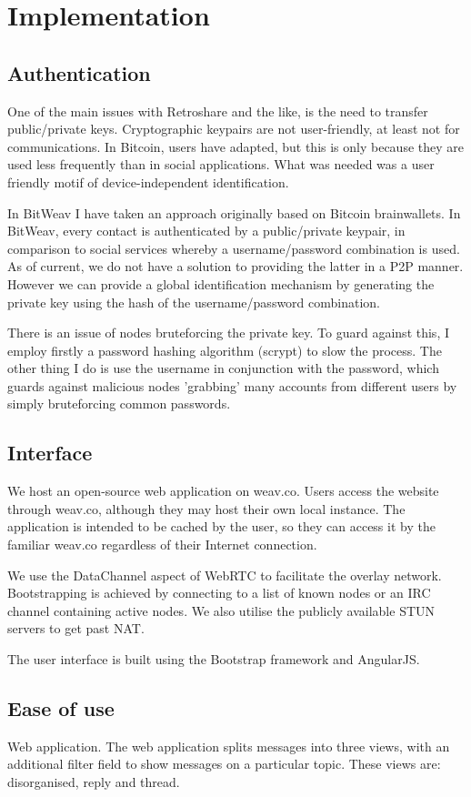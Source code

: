 \documentclass[10pt,a4paper,onecolumn]{article}
\begin{document}
\section{Implementation}
\subsection{Authentication}
One of the main issues with Retroshare and the like, is the need to transfer public/private keys. Cryptographic keypairs are not user-friendly, at least not for communications. In Bitcoin, users have adapted, but this is only because they are used less frequently than in social applications. What was needed was a user friendly motif of device-independent identification. 

In BitWeav I have taken an approach originally based on Bitcoin brainwallets. In BitWeav, every contact is authenticated by a public/private keypair, in comparison to social services whereby a username/password combination is used. As of current, we do not have a solution to providing the latter in a P2P manner. However we can provide a global identification mechanism by generating the private key using the hash of the username/password combination. 

There is an issue of nodes bruteforcing the private key. To guard against this, I employ firstly a password hashing algorithm (scrypt) to slow the process. The other thing I do is use the username in conjunction with the password, which guards against malicious nodes 'grabbing' many accounts from different users by simply bruteforcing common passwords. 

\subsection{Interface}
We host an open-source web application on weav.co. Users access the website through weav.co, although they may host their own local instance. The application is intended to be cached by the user, so they can access it by the familiar weav.co regardless of their Internet connection. 

We use the DataChannel aspect of WebRTC to facilitate the overlay network.  Bootstrapping is achieved by connecting to a list of known nodes or an IRC channel containing active nodes. We also utilise the publicly available STUN servers to get past NAT. 

The user interface is built using the Bootstrap framework and AngularJS. 

\subsection{Ease of use}
Web application. The web application splits messages into three views, with an additional filter field to show messages on a particular topic. These views are: disorganised, reply and thread. 
\end{document}

